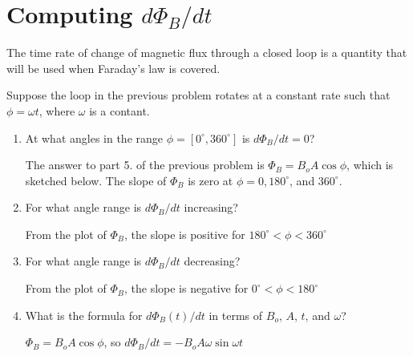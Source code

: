 \documentclass{article}
\begin{document}
\section{Computing $d\Phi_B/dt$}

The time rate of change of magnetic flux through a closed loop is a quantity that will be used when Faraday's law is covered.

Suppose the loop in the previous problem rotates at a constant rate such that $\phi=\omega t$, where $\omega$ is a contant.



\begin{enumerate}

  \item At what angles in the range $\phi=[0^\circ, 360^\circ]$ is $d\Phi_B/dt=0$?

        \ifsolutions
        The answer to part 5. of the previous problem is $\Phi_B=B_oA\cos\phi$, which is sketched below. The slope of $\Phi_B$ is zero at $\phi = 0, 180^\circ$, and $360^\circ$.

        
        \else
        \vskip 60pt
        \fi

  \item For what angle range is $d\Phi_B/dt$ increasing?

        \ifsolutions
        From the plot of $\Phi_B$, the slope is positive for $180^\circ \lt \phi \lt 360^\circ$
        \else
        \vskip 60pt
        \fi

  \item For what angle range is $d\Phi_B/dt$ decreasing?

        \ifsolutions
        From the plot of $\Phi_B$, the slope is negative for $0^\circ \lt \phi \lt 180^\circ$
        \else
        \vskip 60pt
        \fi

  \item What is the formula for $d\Phi_B(t)/dt$ in terms of $B_o$, $A$, $t$, and $\omega$?

        \ifsolutions
        $\Phi_B=B_oA\cos\phi$, so $d\Phi_B/dt = -B_oA\omega\sin\omega t$
        \else

        \fi

\end{enumerate}
\end{document}
